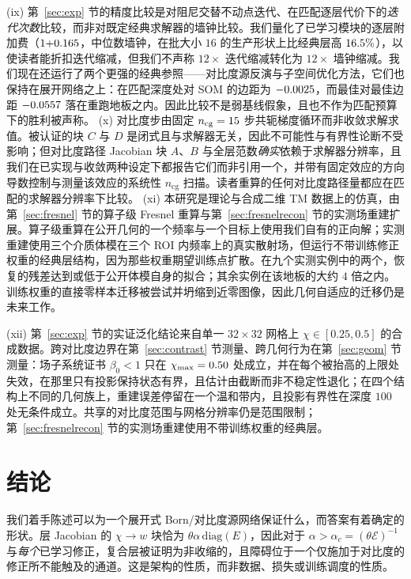 \documentclass[UTF8,a4paper,11pt]{ctexart}
\newcommand{\numv}[1]{#1}
\begin{document}
(ix) 第~\ref{sec:exp} 节的精度比较是对阻尼交替不动点迭代、在匹配逐层代价下的\emph{迭代次数}比较，而非对既定经典求解器的墙钟比较。我们量化了已学习模块的逐层附加费（$1{+}\numv{\NumCostLayerOverhead}$，中位数墙钟，在批大小 $16$ 的生产形状上比经典层高 $\numv{\NumCostLayerOverheadPct}\%$），以使读者能折扣迭代缩减，但我们不声称 $12\times$ 迭代缩减转化为 $12\times$ 墙钟缩减。我们现在还运行了两个更强的经典参照——对比度源反演与子空间优化方法，它们也保持在展开网络之上：在匹配深度处对 SOM 的边距为 $\numv{\NumSomMargKEight}$，而最佳对最佳边距 $\numv{\NumSomMargBest}$ 落在重跑地板之内。因此比较不是弱基线假象，且也不作为匹配预算下的胜利被声称。
(x) 对比度步由固定 $n_{\mathrm{cg}}=\numv{\NumNCg}$ 步共轭梯度循环而非收敛求解求值。被认证的块 $C$ 与 $D$ 是闭式且与求解器无关，因此不可能性与有界性论断不受影响；但对比度路径 Jacobian 块 $A$、$B$ 与全层范数\emph{确实}依赖于求解器分辨率，且我们在已实现与收敛两种设定下都报告它们而非引用一个，并带有固定效应的方向导数控制与测量该效应的系统性 $n_{\mathrm{cg}}$ 扫描。读者重算的任何对比度路径量都应在匹配的求解器分辨率下比较。
(xi) 本研究是理论与合成二维 TM 数据上的仿真，由第~\ref{sec:fresnel} 节的算子级 Fresnel 重算与第~\ref{sec:fresnelrecon} 节的实测场重建扩展。算子级重算在公开几何的一个频率与一个目标上使用我们自有的正向解；实测重建使用三个介质体模在三个 ROI 内频率上的真实散射场，但运行不带训练修正权重的经典层结构，因为那些权重期望训练点扩散。在九个实测实例中的两个，恢复的残差达到或低于公开体模自身的拟合；其余实例在该地板的大约 $4$ 倍之内。训练权重的直接零样本迁移被尝试并坍缩到近零图像，因此几何自适应的迁移仍是未来工作。

(xii) 第~\ref{sec:exp} 节的实证泛化结论来自单一 $32\times32$ 网格上 $\chi\in[0.25,0.5]$ 的合成数据。跨对比度边界在第~\ref{sec:contrast} 节测量、跨几何行为在第~\ref{sec:geom} 节测量：场子系统证书 $\beta_0<1$ 只在 $\chi_{\max}=\numv{\NumMaxChiBox}$ 处成立，并在每个被抬高的上限处失效，在那里只有投影保持状态有界，且估计由截断而非不稳定性退化；在四个结构上不同的几何族上，重建误差停留在一个温和带内，且投影有界性在深度 $100$ 处无条件成立。共享的对比度范围与网格分辨率仍是范围限制；第~\ref{sec:fresnelrecon} 节的实测场重建使用不带训练权重的经典层。

\section{结论}
我们着手陈述可以为一个展开式 Born/对比度源网络保证什么，而答案有着确定的形状。层 Jacobian 的 $\chi\!\to\!w$ 块恰为 $\theta\alpha\,\mathrm{diag}(E)$，因此对于 $\alpha>\alpha_c=(\theta\mathcal{E})^{-1}$ 与\emph{每个}已学习修正，复合层被证明为非收缩的，且障碍位于一个仅施加于对比度的修正所不能触及的通道。这是架构的性质，而非数据、损失或训练调度的性质。
\end{document}
